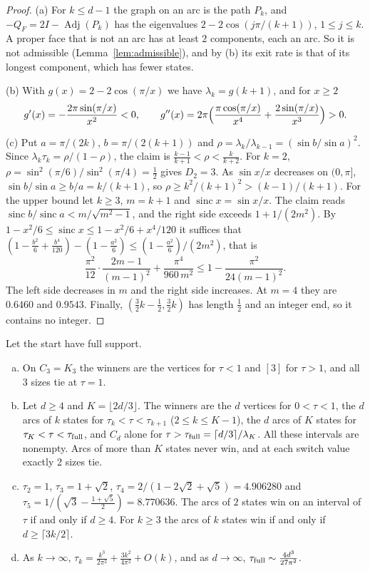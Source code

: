 \begin{proof}
(a) For $k\le d-1$ the graph on an arc is the path $P_k$, and
$-Q_F=2I-\operatorname{Adj}(P_k)$ has the eigenvalues $2-2\cos(j\pi/(k+1))$,
$1\le j\le k$. A proper face that is not an arc has at least $2$ components,
each an arc. So it is not admissible (Lemma~\ref{lem:admissible}), and by (b)
its exit rate is that of its longest component, which has fewer states.

(b) With $g(x)=2-2\cos(\pi/x)$ we have $\lambda_k=g(k+1)$, and for $x\ge2$
\[
g'(x)=-\frac{2\pi\sin(\pi/x)}{x^2}<0,\qquad
g''(x)=2\pi\Bigl(\frac{\pi\cos(\pi/x)}{x^4}+\frac{2\sin(\pi/x)}{x^3}\Bigr)>0.
\]

(c) Put $a=\pi/(2k)$, $b=\pi/(2(k+1))$ and
$\rho=\lambda_k/\lambda_{k-1}=(\sin b/\sin a)^2$. Since
$\lambda_k\tau_k=\rho/(1-\rho)$, the claim is
$\frac{k-1}{k+1}<\rho<\frac k{k+2}$. For $k=2$,
$\rho=\sin^2(\pi/6)/\sin^2(\pi/4)=\frac12$ gives $D_2=3$. As $\sin x/x$
decreases on $(0,\pi]$, $\sin b/\sin a\ge b/a=k/(k+1)$, so
$\rho\ge k^2/(k+1)^2>(k-1)/(k+1)$. For the upper bound let $k\ge3$, $m=k+1$ and
$\operatorname{sinc}x=\sin x/x$. The claim reads $\operatorname{sinc}
b/\operatorname{sinc}a<m/\sqrt{m^2-1}$, and the right side exceeds
$1+1/(2m^2)$. By $1-x^2/6\le\operatorname{sinc}x\le1-x^2/6+x^4/120$ it
suffices that $(1-\frac{b^2}6+\frac{b^4}{120})-(1-\frac{a^2}6)\le
(1-\frac{a^2}6)/(2m^2)$, that is
\[
\frac{\pi^2}{12}\cdot\frac{2m-1}{(m-1)^2}+\frac{\pi^4}{960\,m^2}\le
1-\frac{\pi^2}{24(m-1)^2}.
\]
The left side decreases in $m$ and the right side increases. At $m=4$ they are
$0.6460$ and $0.9543$. Finally, $(\frac32k-\frac12,\frac32k)$ has length
$\frac12$ and an integer end, so it contains no integer.
\end{proof}

\begin{theorem}\label{thm:cycle}
Let the start have full support.
\begin{enumerate}[(a)]
\item On $C_3=K_3$ the winners are the vertices for $\tau<1$ and $[3]$ for
$\tau>1$, and all 3 sizes tie at $\tau=1$.
\item Let $d\ge4$ and $K=\lfloor2d/3\rfloor$. The winners are the $d$ vertices
for $0<\tau<1$, the $d$ arcs of $k$ states for $\tau_k<\tau<\tau_{k+1}$
($2\le k\le K-1$), the $d$ arcs of $K$ states for $\tau_K<\tau<\tau_{\rm
full}$, and $C_d$ alone for $\tau>\tau_{\rm full}=\lceil d/3\rceil/\lambda_K$.
All these intervals are nonempty. Arcs of more than $K$ states never win, and
at each switch value exactly 2 sizes tie.
\item $\tau_2=1$, $\tau_3=1+\sqrt2$, $\tau_4=2/(1-2\sqrt2+\sqrt5)=4.906280$ and
$\tau_5=1/(\sqrt3-\frac{1+\sqrt5}2)=8.770636$. The arcs of $2$ states win on an
interval of $\tau$ if and only if $d\ge4$. For $k\ge3$ the arcs of $k$ states
win if and only if $d\ge\lceil3k/2\rceil$.
\item As $k\to\infty$, $\tau_k=\frac{k^3}{2\pi^2}+\frac{3k^2}{4\pi^2}+O(k)$,
and as $d\to\infty$, $\tau_{\rm full}\sim\frac{4d^3}{27\pi^2}$.
\end{enumerate}
\end{theorem}

